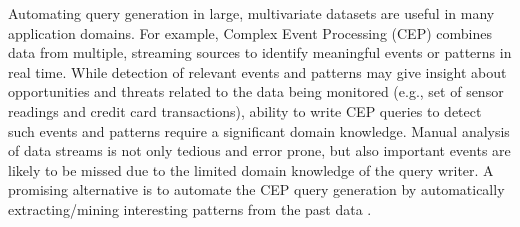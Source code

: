 \documentclass[conference]{IEEEtran}  %
\begin{document}
Automating query generation in large, multivariate datasets are useful in many application domains. For example, Complex Event Processing (CEP) \cite{IEEEexample:CEP} combines data from multiple, streaming sources to identify meaningful events or patterns in real time. While detection of relevant events and patterns may give insight about opportunities and threats related to the data being monitored (e.g., set of sensor readings and credit card transactions), ability to write CEP queries to detect such events and patterns require a significant domain knowledge. Manual analysis of data streams is not only tedious and error prone, but also important events are likely to be missed due to the limited domain knowledge of the query writer. A promising alternative is to automate the CEP query generation by automatically extracting/mining interesting patterns from the past data \cite{IEEEexample:autoCEP,IEEEexample:TowardsAutomated,IEEEexample:LearningFromThePast}.
\end{document}
